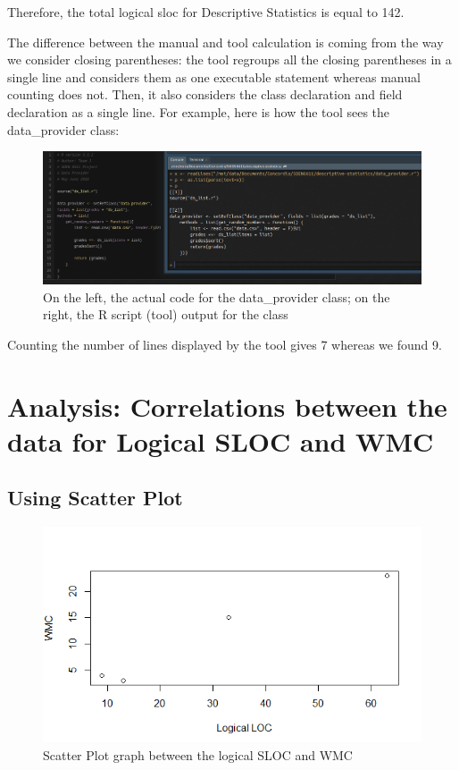 \documentclass[11pt]{article}
\begin{document}
Therefore, the total logical \gls{sloc} for Descriptive Statistics is equal to 142.\newline

\newpage
The difference between the manual and tool calculation is coming from the way we consider closing parentheses: the tool regroups all the closing parentheses in a single line and considers them as one executable statement whereas manual counting does not. Then, it also considers the class declaration and field declaration as a single line. For example, here is how the tool sees the data\_provider class:

\begin{figure}[h!]
	\centering
		\includegraphics[width=\textwidth]{toolvscode.png}
	\caption{On the left, the actual code for the data\_provider class; on the right, the R script (tool) output for the class}
	\label{fig:toolvscode}
\end{figure}

Counting the number of lines displayed by the tool gives 7 whereas we found 9.

\newpage

\section{Analysis: Correlations between the data for Logical SLOC and WMC}

\subsection{Using Scatter Plot}

\begin{figure}[h!]
	\centering
		\includegraphics[width=\textwidth]{cor_graph.png}
	\caption{Scatter Plot graph between the logical SLOC and WMC}
	\label{fig:cor_graph}
\end{figure}
\end{document}

